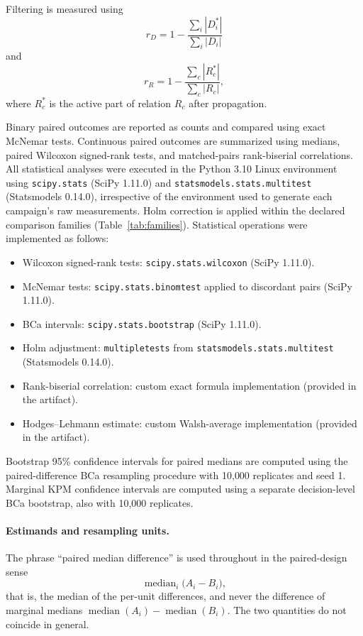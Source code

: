 \documentclass[pdflatex,sn-mathphys-num,iicol,oneside]{sn-jnl}
\begin{document}
Filtering is measured using
\begin{equation}
r_D
=
1-
\frac{\sum_i|D_i^{*}|}
     {\sum_i|D_i|}
\end{equation}
and
\begin{equation}
r_R
=
1-
\frac{\sum_c|R_c^{*}|}
     {\sum_c|R_c|},
\end{equation}
where $R_c^{*}$ is the active part of relation $R_c$ after
propagation.

Binary paired outcomes are reported as counts and compared using
exact McNemar tests. Continuous paired outcomes are summarized using
medians, paired Wilcoxon signed-rank tests, and matched-pairs
rank-biserial correlations. All statistical analyses were executed in the Python 3.10 Linux environment using \texttt{scipy.stats} (SciPy 1.11.0) and \texttt{statsmodels.stats.multitest} (Statsmodels 0.14.0), irrespective of the environment used to generate each campaign's raw measurements. Holm
correction is applied within the declared comparison families (Table~\ref{tab:families}).
Statistical operations were implemented as follows:
\begin{itemize}
\item Wilcoxon signed-rank tests: \texttt{scipy.stats.wilcoxon} (SciPy 1.11.0).
\item McNemar tests: \texttt{scipy.stats.binomtest} applied to discordant pairs (SciPy 1.11.0).
\item BCa intervals: \texttt{scipy.stats.bootstrap} (SciPy 1.11.0).
\item Holm adjustment: \texttt{multipletests} from \texttt{statsmodels.stats.multitest} (Statsmodels 0.14.0).
\item Rank-biserial correlation: custom exact formula implementation (provided in the artifact).
\item Hodges--Lehmann estimate: custom Walsh-average implementation (provided in the artifact).
\end{itemize}
Bootstrap 95\% confidence intervals for paired medians are computed using the paired-difference BCa resampling procedure with 10{,}000 replicates and seed 1. Marginal KPM confidence intervals are computed using a separate decision-level BCa bootstrap, also with 10{,}000 replicates.

\paragraph{Estimands and resampling units.}
The phrase ``paired median difference'' is used throughout in the
paired-design sense
\begin{equation}
\operatorname{median}_{i}\bigl(A_i-B_i\bigr),
\label{eq:estimand}
\end{equation}
that is, the median of the per-unit differences, and never the
difference of marginal medians
$\operatorname{median}(A_i)-\operatorname{median}(B_i)$. The two
quantities do not coincide in general.
\end{document}
